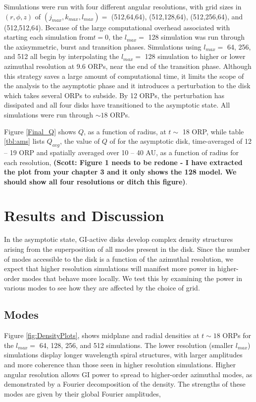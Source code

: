 \documentclass[manuscript]{aastex} %
\begin{document}
Simulations were run with four different angular resolutions, with grid sizes in $(r,\phi,z)$ of  $(j_{max}, k_{max}, l_{max}) =$ (512,64,64), (512,128,64), (512,256,64), and (512,512,64). Because of the large computational overhead associated with starting each simulation from$t = 0$, the $l_{max} =$ 128 simulation was run through the axisymmetric, burst and transition phases. Simulations using $l_{max} =$ 64, 256, and 512 all begin by interpolating the $l_{max} =$ 128 simulation to higher or lower azimuthal resolution at 9.6 ORPs, near the end of the transition
phase. Although this strategy saves a large amount of computational time, it limits the scope of the analysis to the asymptotic phase and it introduces a perturbation to the disk which takes several ORPs to subside. By 12 ORPs, the perturbation has dissipated and all four disks have transitioned to the asymptotic state.  All simulations were 
run through $\sim 18$ ORPs.

Figure \ref{Final_Q} shows $Q$, as a function of radius, at $t \sim$ 18 ORP, while table \ref{tbl:ams} lists $Q_{avg}$, the value of $Q$ of for the asymptotic disk, time-averaged of 12 -- 19 ORP and spatially averaged over 10 -- 40 AU, as a function of radius for each resolution, 
{\bf (Scott: Figure 1 needs to be redone - I have extracted the 
plot from your chapter 3 and it only shows the 128 model.  We should show all four resolutions
or ditch this figure)}.  


\section{Results and Discussion}
	
In the asymptotic state, GI-active disks develop complex density structures arising from the superposition of
all modes present in the disk.  Since the number of modes accessible to the disk is a function of the azimuthal resolution, we expect that higher resolution simulations will manifest more power in higher-order modes 
that behave more locally. We test this by examining the power in various modes to see how they are affected by the choice of grid.

\subsection{Modes}
	
Figure \ref{fig:DensityPlots}, shows midplane and radial densities  at $t \sim 18$ ORPs for the $l_{max} =$ 64, 128, 256, and 512 simulations. The lower resolution (smaller $l_{max}$) simulations display longer wavelength spiral structures, with larger amplitudes and more coherence than those seen in higher resolution simulations. Higher angular resolution allows GI power to spread to higher-order azimuthal modes, as demonstrated by a Fourier decomposition of the density. The strengths of these modes are given by their global Fourier amplitudes,
\end{document}

